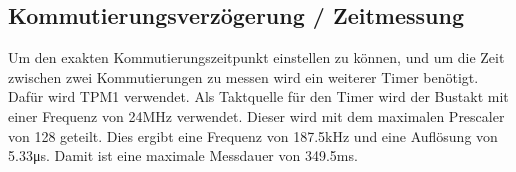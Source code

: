 \subsection{Kommutierungsverzögerung / Zeitmessung}
Um den exakten Kommutierungszeitpunkt einstellen zu können, und um die Zeit 
zwischen zwei Kommutierungen zu messen wird ein weiterer Timer benötigt. Dafür 
wird TPM1 verwendet. Als Taktquelle für den Timer wird der Bustakt mit einer 
Frequenz von 24\si{\mega\hertz} verwendet. Dieser wird mit dem maximalen 
Prescaler von 128 geteilt. Dies ergibt eine Frequenz von 187.5\si{\kilo\hertz} 
und eine Auflösung von 5.33\si{\micro\second}. Damit ist eine maximale 
Messdauer von 349.5\si{\milli\second}. 

